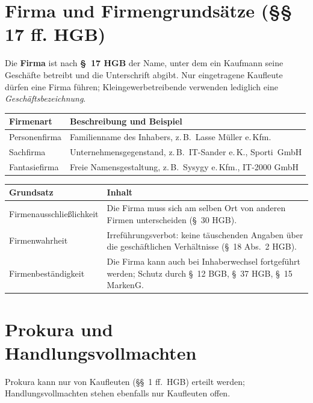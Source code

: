 \documentclass[11pt, a4paper]{article}
\begin{document}
\section{Firma und Firmengrundsätze (§§ 17 ff. HGB)}

Die \textbf{Firma} ist nach \textbf{§~17 HGB} der Name, unter dem ein Kaufmann seine Geschäfte
betreibt und die Unterschrift abgibt. Nur eingetragene Kaufleute dürfen eine Firma führen;
Kleingewerbetreibende verwenden lediglich eine \emph{Geschäftsbezeichnung}.

\begin{center}
\begin{tabular}{p{3cm} p{10cm}}
\toprule
\textbf{Firmenart} & \textbf{Beschreibung und Beispiel}\\
\midrule
Personenfirma & Familienname des Inhabers, z.\,B.\ Lasse Müller e.\,Kfm.\\
Sachfirma & Unternehmensgegenstand, z.\,B.\ IT-Sander e.\,K., Sporti~GmbH\\
Fantasiefirma & Freie Namensgestaltung, z.\,B.\ Sysygy e.\,Kfm., IT-2000 GmbH\\
\bottomrule
\end{tabular}
\end{center}

\begin{center}
\begin{tabular}{p{3cm} p{10cm}}
\toprule
\textbf{Grundsatz} & \textbf{Inhalt}\\
\midrule
Firmenausschließlichkeit & Die Firma muss sich am selben Ort von anderen Firmen unterscheiden (§~30 HGB).\\
Firmenwahrheit & Irreführungsverbot: keine täuschenden Angaben über die geschäftlichen Verhältnisse (§~18 Abs.~2 HGB).\\
Firmenbeständigkeit & Die Firma kann auch bei Inhaberwechsel fortgeführt werden; Schutz durch §~12 BGB, §~37 HGB, §~15 MarkenG.\\
\bottomrule
\end{tabular}
\end{center}

\section{Prokura und Handlungsvollmachten}

Prokura kann nur von Kaufleuten (§§~1 ff.\ HGB) erteilt werden; Handlungsvollmachten stehen
ebenfalls nur Kaufleuten offen.
\end{document}
